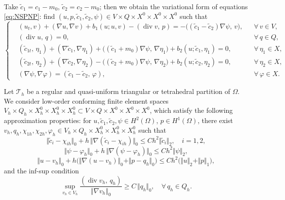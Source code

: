 \documentclass[a4paper,fleqn]{cas-sc}
\numberwithin{equation}{section}
\theoremstyle{definition}
\begin{document}
Take $\tilde{c}_{1}=c_{1}-m_{0}$, $\tilde{c}_{2}=c_{2}-m_{0}$; then we
obtain the variational form of equations \eqref{eq:NSPNP}: find
$(u,p,\tilde{c}_{1},\tilde{c}_{2},\psi)\in V\times Q\times X^{0}\times X^{0}\times X^{0}$
such that
\begin{equation}
  \left\{
  \begin{aligned}
    &(u_{t},v) + (\nabla u,\nabla v) + b_{1}(u;u,v)
      - (\operatorname{div}v,\,p)
      = -\bigl((\tilde{c}_{1}-\tilde{c}_{2})\nabla\psi,\,v\bigr),
      &&\forall\,v\in V,\\[4pt]
    &(\operatorname{div}u,\,q) = 0,
      &&\forall\,q\in Q,\\[4pt]
    &(\tilde{c}_{1t},\,\eta_{1})
      + (\nabla\tilde{c}_{1},\nabla\eta_{1})
      + \bigl((\tilde{c}_{1}+m_{0})\nabla\psi,\,\nabla\eta_{1}\bigr)
      + b_{2}(u;\tilde{c}_{1},\eta_{1}) = 0,
      &&\forall\,\eta_{1}\in X,\\[4pt]
    &(\tilde{c}_{2t},\,\eta_{2})
      + (\nabla\tilde{c}_{2},\nabla\eta_{2})
      - \bigl((\tilde{c}_{2}+m_{0})\nabla\psi,\,\nabla\eta_{2}\bigr)
      + b_{2}(u;\tilde{c}_{2},\eta_{2}) = 0,
      &&\forall\,\eta_{2}\in X,\\[4pt]
    &(\nabla\psi,\nabla\varphi) = (\tilde{c}_{1}-\tilde{c}_{2},\,\varphi),
      &&\forall\,\varphi\in X.
  \end{aligned}
  \right.
  \label{eq:2.13}
\end{equation}

Let $\mathcal{T}_{h}$ be a regular and quasi-uniform triangular or
tetrahedral partition of $\Omega$. We consider low-order conforming finite
element spaces
$V_{h}\times Q_{h}\times X^{0}_{h}\times X^{0}_{h}\times X^{0}_{h}
\subset V\times Q\times X^{0}\times X^{0}\times X^{0}$,
which satisfy the following approximation properties: for
$u,\tilde{c}_{1},\tilde{c}_{2},\psi\in H^{2}(\Omega)$,
$p\in H^{1}(\Omega)$, there exist
$v_{h},q_{h},\chi_{1h},\chi_{2h},\varphi_{h}
\in V_{h}\times Q_{h}\times X^{0}_{h}\times X^{0}_{h}\times X^{0}_{h}$
such that
\begin{equation}
  \Vert\tilde{c}_{i}-\chi_{ih}\Vert_{0}
  + h\,\Vert\nabla(\tilde{c}_{i}-\chi_{ih})\Vert_{0}
  \le Ch^{2}\Vert\tilde{c}_{i}\Vert_{2},
  \quad i=1,2,
  \label{eq:2.14}
\end{equation}
\begin{equation}
  \Vert\psi-\varphi_{h}\Vert_{0}
  + h\,\Vert\nabla(\psi-\varphi_{h})\Vert_{0}
  \le Ch^{2}\Vert\psi\Vert_{2},
  \label{eq:2.15}
\end{equation}
\begin{equation}
  \Vert u-v_{h}\Vert_{0}
  + h\bigl(\Vert\nabla(u-v_{h})\Vert_{0}
         + \Vert p-q_{h}\Vert_{0}\bigr)
  \le Ch^{2}\bigl(\Vert u\Vert_{2}+\Vert p\Vert_{1}\bigr),
  \label{eq:2.16}
\end{equation}
and the inf-sup condition \cite{John2016}
\begin{equation}
  \sup_{v_{h}\in V_{h}}
  \frac{(\operatorname{div}v_{h},\,q_{h})}{\Vert\nabla v_{h}\Vert_{0}}
  \ge C\,\Vert q_{h}\Vert_{0},
  \quad \forall\,q_{h}\in Q_{h}.
  \label{eq:2.17}
\end{equation}
\end{document}
